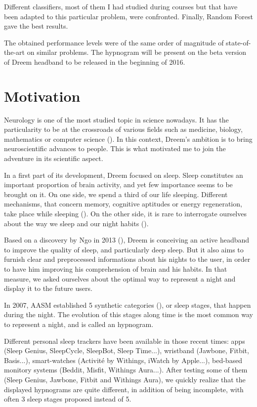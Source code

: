 \documentclass[12pt]{report}
\begin{document}
Different classifiers, most of them I had studied during courses but that have been adapted to this particular problem, were confronted. Finally, Random Forest gave the best results.

The obtained performance levels were of the same order of magnitude of state-of-the-art on similar problems. The hypnogram will be present on the beta version of Dreem headband to be released in the beginning of 2016.

\newpage
  \tableofcontents
\newpage

\chapter*{Motivation}

Neurology is one of the most studied topic in science nowadays. It has the particularity to be at the crossroads of various fields such as medicine, biology, mathematics or computer science (\cite{bear2007neuroscience}). In this context, Dreem's ambition is to bring neuroscientific advances to people. This is what motivated me to join the adventure in its scientific aspect.

In a first part of its development, Dreem focused on sleep. Sleep constitutes an important proportion of brain activity, and yet few importance seems to be brought on it. On one side, we spend a third of our life sleeping. Different mechanisms, that concern memory, cognitive aptitudes or energy regeneration, take place while sleeping (\cite{carskadon2000normal}). On the other side, it is rare to interrogate ourselves about the way we sleep and our night habits (\cite{ohayon2000prevalence}).

Based on a discovery by Ngo in 2013 (\cite{ngo2013auditory}), Dreem is conceiving an active headband to improve the quality of sleep, and particularly deep sleep. But it also aims to furnish clear and preprocessed informations about his nights to the user, in order to have him improving his comprehension of brain and his habits. In that measure, we asked ourselves about the optimal way to represent a night and display it to the future users.

In 2007, AASM established 5 synthetic categories (\cite{berry2012aasm}), or sleep stages, that happen during the night. The evolution of this stages along time is the most common way to represent a night, and is called an hypnogram.

Different personal sleep trackers have been available in those recent times: apps (Sleep Genius, SleepCycle, SleepBot, Sleep Time...), wristband (Jawbone, Fitbit, Basis...), smart-watches (Activité by Withings, iWatch by Apple...), bed-based monitory systems (Beddit, Misfit, Withings Aura...). After testing some of them (Sleep Genius, Jawbone, Fitbit and Withings Aura), we quickly realize that the displayed hypnograms are quite different, in addition of being incomplete, with often 3 sleep stages proposed instead of 5.
\end{document}
